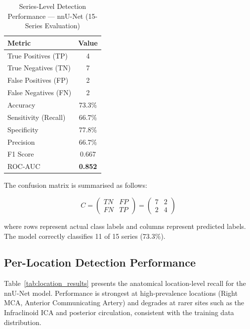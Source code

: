 \documentclass[journal]{IEEEtran}
\begin{document}
\begin{table}[!t]
\renewcommand{\arraystretch}{1.3}
\caption{Series-Level Detection Performance — nnU-Net (15-Series Evaluation)}
\label{tab:results}
\centering
\begin{tabular}{lc}
\toprule
\textbf{Metric} & \textbf{Value} \\
\midrule
True Positives  (TP) & 4  \\
True Negatives  (TN) & 7  \\
False Positives (FP) & 2  \\
False Negatives (FN) & 2  \\
\midrule
Accuracy             & 73.3\% \\
Sensitivity (Recall) & 66.7\% \\
Specificity          & 77.8\% \\
Precision            & 66.7\% \\
F1 Score             & 0.667  \\
ROC-AUC              & \textbf{0.852}  \\
\bottomrule
\end{tabular}
\end{table}


The confusion matrix is summarised as follows:

\begin{equation}
C = \begin{pmatrix} TN & FP \\ FN & TP \end{pmatrix}
  = \begin{pmatrix} 7 & 2 \\ 2 & 4 \end{pmatrix}
\end{equation}

\noindent where rows represent actual class labels and columns represent
predicted labels. The model correctly classifies 11 of 15 series (73.3\%).

\subsection{Per-Location Detection Performance}

Table~\ref{tab:location_results} presents the anatomical location-level
recall for the nnU-Net model. Performance is strongest at high-prevalence
locations (Right MCA, Anterior Communicating Artery) and degrades at
rarer sites such as the Infraclinoid ICA and posterior circulation, consistent
with the training data distribution.
\end{document}
